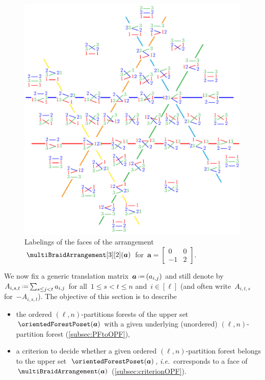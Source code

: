 \documentclass{amsart}
\theoremstyle{definition}
\renewcommand{\b}[1]{{\boldsymbol{#1}}} %
\newcommand{\eqdef}{\mbox{\,\raisebox{0.2ex}{\scriptsize\ensuremath{\mathrm:}}\ensuremath{=}\,}} %
\newcommand{\ie}{\textit{i.e.}~} %
\renewcommand{\b}[1]{\boldsymbol{#1}} %
\begin{document}
\begin{figure}
	\includegraphics[scale=.9]{B23b}
	\caption{Labelings of the faces of the arrangement~$\multiBraidArrangement[3][2](\b{a})$ for~$\b{a} = \begin{bmatrix} 0 & 0 \\ -1 & 2 \end{bmatrix}$.}
	\label{fig:B23b}
\end{figure}

We now fix a generic translation matrix~$\b{a} \eqdef (a_{i,j})$ and still denote by~$A_{i,s,t} \eqdef \smash{\sum_{s \le j < t} a_{i,j}}$ for all~$1 \le s < t \le n$ and~$i \in [\ell]$ (and often write~$A_{i,t,s}$ for~$-A_{i,s,t}$).
The objective of this section is to describe
\begin{itemize}
\item the ordered $(\ell,n)$-partitions forests of the upper set~$\orientedForestPoset(\b{a})$ with a given underlying (unordered) $(\ell,n)$-partition forest (\cref{subsec:PFtoOPF}),
\item a criterion to decide whether a given ordered $(\ell,n)$-partition forest belongs to the upper set~$\orientedForestPoset(\b{a})$, \ie corresponds to a face of~$\multiBraidArrangement(\b{a})$ (\cref{subsec:criterionOPF}).
\end{itemize}
\end{document}
